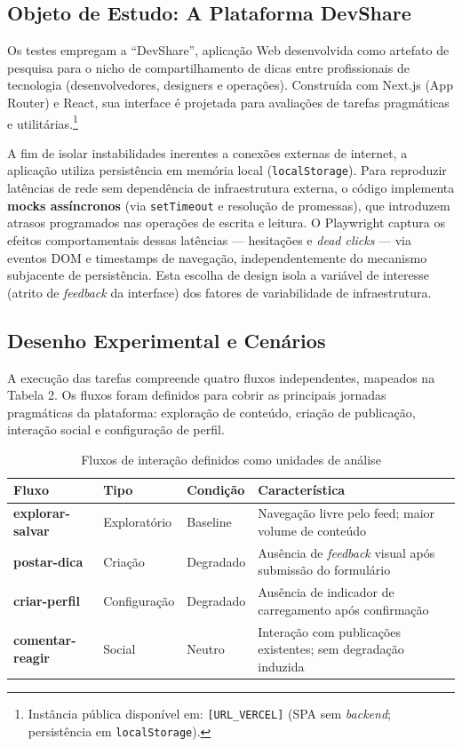 \documentclass[12pt]{article}
\begin{document}
\subsection{Objeto de Estudo: A Plataforma DevShare}

Os testes empregam a ``DevShare'', aplicação Web desenvolvida como artefato de pesquisa para o nicho de compartilhamento de dicas entre profissionais de tecnologia (desenvolvedores, designers e operações). Construída com Next.js (App Router) e React, sua interface é projetada para avaliações de tarefas pragmáticas e utilitárias.\footnote{Instância pública disponível em: \texttt{[URL\_VERCEL]} (SPA sem \textit{backend}; persistência em \texttt{localStorage}).}

A fim de isolar instabilidades inerentes a conexões externas de internet, a aplicação utiliza persistência em memória local (\texttt{localStorage}). Para reproduzir latências de rede sem dependência de infraestrutura externa, o código implementa \textbf{mocks assíncronos} (via \texttt{setTimeout} e resolução de promessas), que introduzem atrasos programados nas operações de escrita e leitura. O Playwright captura os efeitos comportamentais dessas latências --- hesitações e \textit{dead clicks} --- via eventos DOM e timestamps de navegação, independentemente do mecanismo subjacente de persistência. Esta escolha de design isola a variável de interesse (atrito de \textit{feedback} da interface) dos fatores de variabilidade de infraestrutura.

\subsection{Desenho Experimental e Cenários}

A execução das tarefas compreende quatro fluxos independentes, mapeados na Tabela 2. Os fluxos foram definidos para cobrir as principais jornadas pragmáticas da plataforma: exploração de conteúdo, criação de publicação, interação social e configuração de perfil.

\begin{table}[htbp]
  \centering
  \caption{Fluxos de interação definidos como unidades de análise}
  \begin{tabular}{p{2.8cm} p{2.5cm} p{2cm} p{5.2cm}}
    \toprule
    \textbf{Fluxo} & \textbf{Tipo} & \textbf{Condição} & \textbf{Característica} \\
    \midrule
    \textbf{explorar-salvar}  & Exploratório & Baseline  & Navegação livre pelo feed; maior volume de conteúdo \\
    \textbf{postar-dica}      & Criação      & Degradado & Ausência de \textit{feedback} visual após submissão do formulário \\
    \textbf{criar-perfil}     & Configuração & Degradado & Ausência de indicador de carregamento após confirmação \\
    \textbf{comentar-reagir}  & Social       & Neutro     & Interação com publicações existentes; sem degradação induzida \\
    \bottomrule
  \end{tabular}
\end{table}
\end{document}
